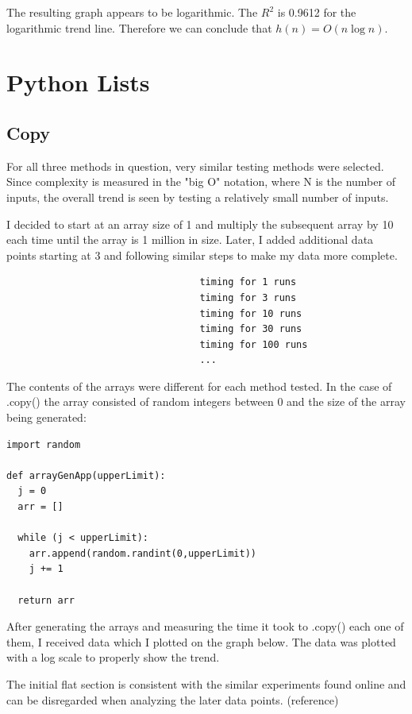 \documentclass[12pt]{article}
\begin{document}
\noindent The resulting graph appears to be logarithmic. The $R^2$ is 0.9612 for the logarithmic trend line. Therefore we can conclude that $h(n) = O(n\log{n})$.

\section{Python Lists}

\subsection{Copy}
For all three methods in question, very similar testing methods were selected. Since complexity is measured in the "big O" notation, where N is the number of inputs, the overall trend is seen by testing a relatively small number of inputs. 

I decided to start at an array size of 1 and multiply the subsequent array by 10 each time until the array is 1 million in size. Later, I  added additional data points starting at 3 and following similar steps to make my data more complete. 

\footnotesize
\begin{verbatim}
                                  timing for 1 runs
                                  timing for 3 runs
                                  timing for 10 runs
                                  timing for 30 runs
                                  timing for 100 runs
                                  ...
\end{verbatim}
\normalsize
  
The contents of the arrays were different for each method tested. In the case of .copy() the array consisted of random integers between 0 and the size of the array being generated:

\footnotesize
\begin{verbatim}
import random

def arrayGenApp(upperLimit):
  j = 0
  arr = []

  while (j < upperLimit):
    arr.append(random.randint(0,upperLimit))
    j += 1

  return arr
\end{verbatim}
\normalsize

After generating the arrays and measuring the time it took to .copy() each one of them, I received data which I plotted on the graph below. The data was plotted with a log scale to properly show the trend.

The initial flat section is consistent with the similar experiments found online and can be disregarded when analyzing the later data points. (reference)
\end{document}
